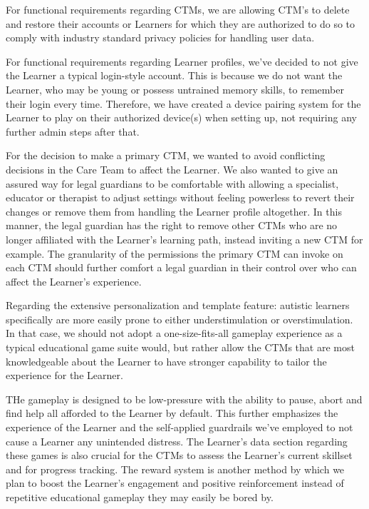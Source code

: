 \documentclass[12pt]{article}
\begin{document}
For functional requirements regarding CTMs, we are allowing CTM's to delete and restore their accounts or Learners for which they are authorized to do so to comply with industry standard privacy policies for handling user data. 

For functional requirements regarding Learner profiles, we've decided to not give the Learner a typical login-style account. This is because we do not want the Learner, who may be young or possess untrained memory skills, to remember their login every time. Therefore, we have created a device pairing system for the Learner to play on their authorized device(s) when setting up, not requiring any further admin steps after that.

For the decision to make a primary CTM, we wanted to avoid conflicting decisions in the Care Team to affect the Learner. We also wanted to give an assured way for legal guardians to be comfortable with allowing a specialist, educator or therapist to adjust settings without feeling powerless to revert their changes or remove them from handling the Learner profile altogether. In this manner, the legal guardian has the right to remove other CTMs who are no longer affiliated with the Learner's learning path, instead inviting a new CTM for example. The granularity of the permissions the primary CTM can invoke on each CTM should further comfort a legal guardian in their control over who can affect the Learner's experience.

Regarding the extensive personalization and template feature: autistic learners specifically are more easily prone to either understimulation or overstimulation. In that case, we should not adopt a one-size-fits-all gameplay experience as a typical educational game suite would, but rather allow the CTMs that are most knowledgeable about the Learner to have stronger capability to tailor the experience for the Learner.

THe gameplay is designed to be low-pressure with the ability to pause, abort and find help all afforded to the Learner by default. This further emphasizes the experience of the Learner and the self-applied guardrails we've employed to not cause a Learner any unintended distress. The Learner's data section regarding these games is also crucial for the CTMs to assess the Learner's current skillset and for progress tracking. The reward system is another method by which we plan to boost the Learner's engagement and positive reinforcement instead of repetitive educational gameplay they may easily be bored by.\\
\end{document}
